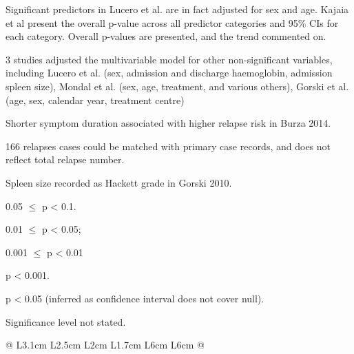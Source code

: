 
{%



\begin{landscape}
  \footnotesize
  \begin{ThreePartTable}
    \begin{TableNotes}
      \item[1] Significant predictors in Lucero et al. are in fact adjusted for sex and age. Kajaia et al present the overall p-value across all predictor categories and 95\% CIs for each category. Overall p-values are presented, and the trend commented on.
      \item[2] 3 studies adjusted the multivariable model for other non-significant variables, including Lucero et al. (sex, admission and discharge haemoglobin, admission spleen size), Mondal et al. (sex, age, treatment, and various others), Gorski et al. (age, sex, calendar year, treatment centre)
      \item[3] Shorter symptom duration associated with higher relapse risk in Burza 2014.
      \item[4] 166 relapses cases could be matched with primary case records, and does not reflect total relapse number.
      \item[5] Spleen size recorded as Hackett grade in Gorski 2010.
      \item[*] 0.05 $\leq$ p < 0.1.
      \item[**] 0.01 $\leq$ p < 0.05;
      \item[***] 0.001 $\leq$ p < 0.01
      \item[****] p < 0.001.
      \item[$\dagger$] p < 0.05 (inferred as confidence interval does not cover null).
      \item[$\dagger\dagger$] Significance level not stated.
    \end{TableNotes}
    \begin{longtable}[c]{@{} L{3.1cm} L{2.5cm} L{2cm} L{1.7cm} L{6cm} L{6cm} @{}}


\end{longtable}
\end{ThreePartTable}
\end{landscape}}

